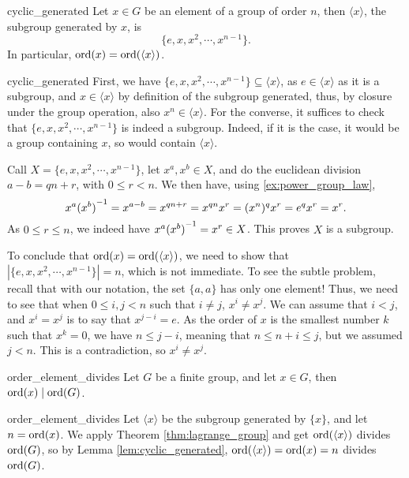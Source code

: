 \begin{clem}{}{cyclic_generated}
    Let \( x \in G \) be an element of a group of order \( n \), then \( \langle x \rangle \), the subgroup generated by \( x \), is 
    \begin{equation*}
        \{ e, x, x^2, \cdots, x^{n - 1} \}.
    \end{equation*}
    In particular, \( \operatorname{ord}(x) = \operatorname{ord}(\langle x \rangle) \).
\end{clem}
\begin{lemproof}{cyclic_generated}
    First, we have \( \{ e, x, x^2, \cdots, x^{n - 1} \} \subseteq \langle x \rangle \), as \( e \in \langle x \rangle \) as it is a subgroup, and \( x \in \langle x \rangle \) by definition of the subgroup generated, thus, by closure under the group operation, also \( x^n \in \langle x \rangle \). For the converse, it suffices to check that \( \{ e, x, x^2, \cdots, x^{n - 1} \} \) is indeed a subgroup. Indeed, if it is the case, it would be a group containing \( x \), so would contain \( \langle x \rangle \). 
    
    Call \( X = \{ e, x, x^2, \cdots, x^{n - 1} \} \), let \( x^a, x^b \in X \), and do the euclidean division \( a - b = qn + r \), with \( 0 \le r < n \). We then have, using \ref{ex:power_group_law},
    \begin{equation*}
        x^a {(x^b)}^{-1} = x^{a - b} = x^{qn + r} = x^{qn}x^r = (x^n)^qx^r = e^qx^r = x^r.
    \end{equation*}      
    As \( 0 \le r \le n \), we indeed have \( x^a {(x^b)}^{-1} = x^r \in X \). This proves \( X \) is a subgroup. 

    To conclude that \( \operatorname{ord}(x) = \operatorname{ord}(\langle x \rangle) \), we need to show that \( |  \{ e, x, x^2, \cdots, x^{n - 1} \} | = n \), which is not immediate. To see the subtle problem, recall that with our notation, the set \( \{ a, a \} \) has only one element! Thus, we need to see that when \( 0 \le i, j < n \) such that \( i \neq j \), \( x^i \neq x^j \). We can assume that \( i < j \), and \( x^i = x^j \) is to say that \( x^{j - i} = e \). As the order of \( x \) is the smallest number \( k \) such that \( x^k = 0 \), we have \( n \le j - i \), meaning that \( n \le n + i \le j \), but we assumed \( j < n \). This is a contradiction, so \( x^i \neq x^j \). 
\end{lemproof}

\begin{ccor}{}{order_element_divides}
    Let \( G \) be a finite group, and let \( x \in G \), then \( \operatorname{ord}(x) \mid \operatorname{ord}(G) \).
\end{ccor}
\begin{corproof}{order_element_divides}
    Let \( \langle x \rangle \) be the subgroup generated by \( \{ x \} \), and let \( n = \operatorname{ord}(x) \). We apply Theorem \ref{thm:lagrange_group} and get \( \operatorname{ord}(\langle x \rangle) \) divides \( \operatorname{ord}(G) \), so by Lemma \ref{lem:cyclic_generated}, \( \operatorname{ord} (\langle x \rangle) = \operatorname{ord}(x) = n \) divides \( \operatorname{ord}(G) \).   
\end{corproof}

